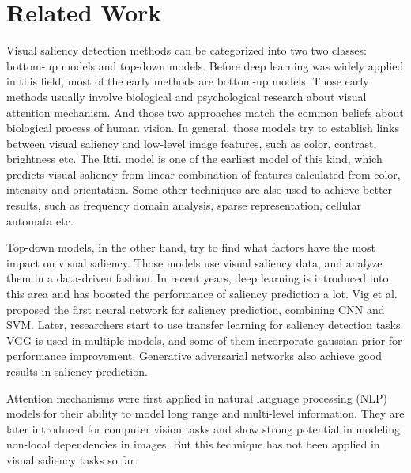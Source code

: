 \documentclass[12pt]{article}
\begin{document}
\section{Related Work}
Visual saliency detection methods can be categorized into two two classes: bottom-up models and top-down models\cite{congReviewVisualSaliency2019}.
Before deep learning was widely applied in this field, most of the early methods are bottom-up models.
Those early methods usually involve biological and psychological research about visual attention mechanism. And those two approaches match the common beliefs about biological process of human vision.
In general, those models try to establish links between visual saliency and low-level image features, such as color, contrast, brightness etc. The Itti. model\cite{ittiModelSaliencybasedVisual1998}
is one of the earliest model of this kind, which predicts visual saliency from linear combination of features calculated from color, intensity and orientation.
Some other techniques are also used to achieve better results, such as frequency domain analysis, sparse representation, cellular automata etc\cite{congReviewVisualSaliency2019}.

Top-down models, in the other hand, try to find what factors have the most impact on visual saliency. Those models use visual saliency data, and analyze them in a data-driven fashion.
In recent years, deep learning is introduced into this area and has boosted the performance of saliency prediction a lot.
Vig et al. \cite{vigLargeScaleOptimizationHierarchical2014} proposed the first neural network for saliency prediction, combining CNN and SVM. Later, researchers start to use transfer learning for saliency 
detection tasks. VGG is used in multiple models\cite{kruthiventiDeepFixFullyConvolutional2015, kummererDeepGazeIIReading2016, corniaPredictingHumanEye2018}, and some of them incorporate gaussian prior for performance improvement.
Generative adversarial networks also achieve good results in saliency prediction\cite{panSalGANVisualSaliency2018, cheHowGazeInfluenced2020}.

Attention mechanisms were first applied in natural language processing (NLP) models for their ability to model long range and multi-level information\cite{bahdanauNeuralMachineTranslation2016a, vaswaniAttentionAllYou2017a}.
They are later introduced for computer vision tasks and show strong potential in modeling non-local dependencies in images\cite{zhangSelfAttentionGenerativeAdversarial2019a}.
But this technique has not been applied in visual saliency tasks so far.
\newpage




\end{document}
